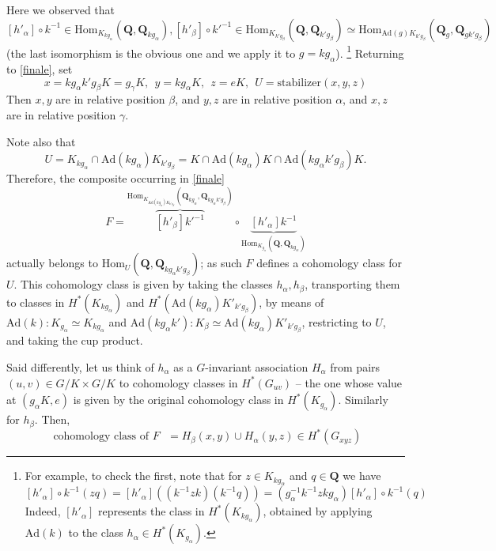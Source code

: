 \documentclass[10pt]{amsart}
\newcommand{\Ad}{\mathrm{Ad}}
\newcommand{\Hom}{\mathrm{Hom}}
\theoremstyle{remark}
\begin{document}
Here we observed 
 that  {\small $$[h'_{\alpha}] \circ k^{-1} \in \Hom_{K_{k g_{\alpha}}}(\mathbf{Q}, \mathbf{Q}_{k g_{\alpha}}),
 [h'_{\beta}] \circ k'^{-1} \in \Hom_{K_{k'g_\beta}}(\mathbf{Q}, \mathbf{Q}_{k'g_{\beta}}) 
\simeq  \Hom_{\Ad(g) K_{k' g_{\beta}}} (\mathbf{Q}_{g}, \mathbf{Q}_{g  k'g_{\beta}}) $$}
(the last isomorphism is the obvious one and we apply it to $g =kg_{\alpha}$). \footnote{For example, to check the first,  
note that for  $z \in K_{k g_{\alpha}}$  and $q \in \mathbf{Q}$ we have
 $$ [h'_{\alpha}]  \circ k^{-1} (zq) = [h'_{\alpha}]   \left( (k^{-1} zk) (k^{-1} q) \right)  = (g_{\alpha}^{-1} k^{-1} z k g_{\alpha}) [h'_{\alpha}]\circ k^{-1}( q)$$
 Indeed, 
 $[h'_{\alpha}]$ represents the class in $H^*(K_{k g_{\alpha}})$, obtained by applying $\Ad(k)$ to the class $h_{\alpha} \in H^*(K_{g_{\alpha}})$.}
Returning to \eqref{finale}, set
$$ x = k g_{\alpha} k' g_{\beta} K = g_{\gamma} K, \ \ y = k g_{\alpha} K, \ \ z = eK, \ \ U = \mathrm{stabilizer}(x, y, z)$$
Then $x,y$ are in relative position $\beta$, and  $y, z$ are in relative position $\alpha$, and $x,z$ are in relative position $\gamma$. 
 
Note also that  $$U= K_{k g_{\alpha}} \cap \Ad(k g_{\alpha}) K_{k' g_{\beta}}  =K \cap \Ad(k g_{\alpha}) K \cap \Ad(k g_{\alpha} k' g_{\beta}) K.$$ 
Therefore, the composite  occurring in \eqref{finale} 
$$    F = \overbrace{[h'_{\beta}] k'^{-1}}^ {\Hom_{K_{\Ad(k g_{\alpha}) K_{k' g_{\beta}}}}(\mathbf{Q}_{k g_{\alpha}}, \mathbf{Q}_{k g_{\alpha} k' g_{\beta}}) }  \circ  \underbrace{ [h'_{\alpha}] k^{-1}}_{\Hom_{K_{g_{\alpha}}}(\mathbf{Q}, \mathbf{Q}_{k g_{\alpha}}) }$$
actually belongs to  $ \Hom_U(\mathbf{Q}, \mathbf{Q}_{k g_{\alpha} k' g_{\beta}}) $; as such $F$ defines a cohomology class for $U$. 
This cohomology class is given by  taking the classes $h_{\alpha}, h_{\beta}$, transporting them to classes in $H^*(K_{k g_{\alpha}})$ and
 $H^*(\Ad(k g_{\alpha}) K'_{k' g_{\beta}})$,
by means of $\Ad(k): K_{g_{\alpha}} \simeq K_{k g_{\alpha}}$  and $\Ad(k g_{\alpha} k'): K_{\beta} \simeq \Ad(k g_{\alpha}) K'_{k' g_{\beta}}$, 
restricting to $U$, and taking the cup product. 

Said differently, let us think of $h_{\alpha}$ as a $G$-invariant association $H_{\alpha}$
from pairs $(u,v) \in G/K \times G/K$ to cohomology classes in $H^*(G_{uv})$ --
the one whose value at $(g_{\alpha} K, e)$ is given by the original cohomology class in $H^*(K_{g_{\alpha}})$. 
Similarly for $h_{\beta}$. Then, 
$$ \mbox{ cohomology class of $F$ } = H_{\beta}(x,y)  \cup H_{\alpha}(y, z) \in H^*(G_{xyz})$$ 
\end{document}
